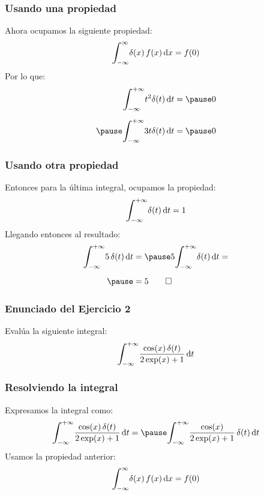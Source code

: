 \documentclass[12pt]{beamer}
\begin{document}
\begin{frame}
\frametitle{Usando una propiedad}
Ahora ocupamos la siguiente propiedad:
\pause
\begin{align*}
\scaleint{6ex}_{\bs -\infty}^{\infty} \delta (x) \, f (x) \dd{x} = f (0)
\end{align*}
\pause
Por lo que:
\begin{eqnarray*}
\begin{aligned}
\scaleint{6ex}_{\bs -\infty}^{+\infty} t^{2} \delta (t) \dd{t} = \pause 0 \\[0.5em] \pause
\scaleint{6ex}_{\bs -\infty}^{+\infty} 3 t \delta (t) \dd{t} =  \pause 0
\end{aligned}
\end{eqnarray*}
\end{frame}

\begin{frame}
\frametitle{Usando otra propiedad}
Entonces para la última integral, ocupamos la propiedad:
\pause
\begin{align*}
\scaleint{6ex}_{\bs -\infty}^{+\infty} \delta (t) \dd{t} =  1
\end{align*}
\pause
Llegando entonces al resultado:
\begin{eqnarray*}
\begin{aligned}
\scaleint{6ex}_{\bs -\infty}^{+\infty} 5 \, \delta (t) \dd{t} &= \pause 5 \scaleint{6ex}_{\bs -\infty}^{+\infty} \delta (t) \dd{t} = \\[0.5em] \pause
&= 5 \qed
\end{aligned}
\end{eqnarray*}
\end{frame}

\begin{frame}
\frametitle{Enunciado del Ejercicio 2}
Evalúa la siguiente integral:
\pause
\begin{align*}
\scaleint{6ex}_{\bs -\infty}^{+\infty} \dfrac{\cos (x) \, \delta (t)}{2 \exp(x) + 1}  \dd{t}
\end{align*}
\end{frame}

\begin{frame}
\frametitle{Resolviendo la integral}
Expresamos la integral como:
\pause
\begin{eqnarray*}
\begin{aligned}
\scaleint{6ex}_{\bs -\infty}^{+\infty} \dfrac{\cos (x) \, \delta (t)}{2 \exp(x) + 1} \dd{t} = \pause  
\scaleint{6ex}_{\bs -\infty}^{+\infty} \dfrac{\cos (x)}{2 \exp(x) + 1} \, \delta (t) \dd{t}
\end{aligned}
\end{eqnarray*}
\pause
Usamos la propiedad anterior:
\begin{align*}
\scaleint{6ex}_{\bs -\infty}^{\infty} \delta (x) \, f (x) \dd{x} = f (0)
\end{align*}
\end{frame}
\end{document}
